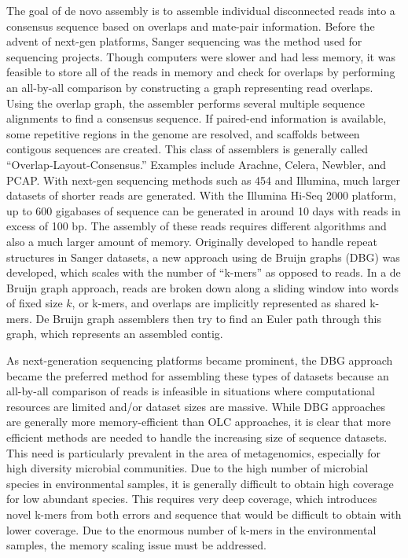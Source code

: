 \documentclass[12pt]{article} \usepackage{simplemargins}
\begin{document}
The goal of de novo assembly is to assemble individual disconnected
reads into a consensus sequence based on overlaps and mate-pair
information. Before the advent of next-gen platforms, Sanger
sequencing was the method used for sequencing projects.  Though
computers were slower and had less memory, it was feasible to
store all of the reads in memory and check for overlaps by performing
an all-by-all comparison by constructing a graph 
representing read overlaps\cite{assemblyreview}. Using the 
overlap graph, the assembler 
performs several multiple sequence alignments to find a consensus sequence. 
If paired-end information is available, some repetitive regions in the 
genome are resolved, and scaffolds between contigous sequences are 
created. This class of assemblers is generally called 
``Overlap-Layout-Consensus.'' Examples include
Arachne\cite{arachne}, Celera\cite{celera}, Newbler\cite{newbler}, and 
PCAP\cite{pcap}. With next-gen sequencing 
methods such as 454 and Illumina, much larger datasets of shorter reads 
are generated. With the Illumina Hi-Seq 2000 platform, up to 600 
gigabases of sequence can be generated 
in around 10 days with reads in excess of 100 bp. The assembly of 
these reads requires different
algorithms and also a much larger amount of memory. Originally developed to 
handle repeat structures in Sanger datasets, a new approach using de Bruijn 
graphs (DBG) was developed\cite{pmid11504945}, which scales with the number 
of ``k-mers'' as opposed to reads.
In a de Bruijn
graph approach, reads are broken down along a sliding window into words of fixed
size $k$, or k-mers, and overlaps are implicitly represented as shared k-mers.
De Bruijn graph assemblers then try to find an Euler path through
this graph, which represents an assembled contig\cite{assemblyreview}.

As next-generation sequencing platforms became prominent, the DBG approach
became the preferred method for assembling these types of datasets
because an all-by-all comparison of reads is infeasible in situations where 
computational resources are limited and/or dataset sizes are massive. While DBG
approaches are generally more memory-efficient than OLC approaches, it
is clear that more efficient methods are needed to handle the
increasing size of sequence datasets. This need is particularly
prevalent in the area of metagenomics, especially for high diversity
microbial communities. Due to the high number of microbial species 
in environmental samples, it is generally difficult to obtain high coverage 
for low abundant species. This 
requires very deep coverage, which introduces novel k-mers from both 
errors and sequence that 
would be difficult to obtain with lower coverage. Due to the enormous 
number of k-mers in the 
environmental samples, the memory scaling issue must be addressed.
\end{document}
